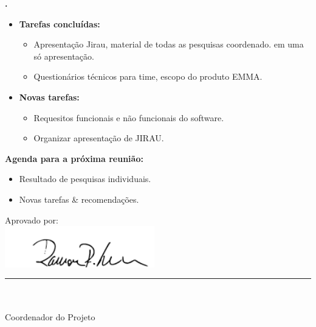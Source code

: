	
   \textbf{\julia.} 
	\begin{itemize}
		\item \textbf{Tarefas concluídas:}
			\begin{itemize}    
				\item Apresentação Jirau, material de todas as pesquisas coordenado.
				em uma só apresentação.
				\item Questionários técnicos para time, escopo do
				produto EMMA.
			\end{itemize}
		
		\item \textbf{Novas tarefas:}
			\begin{itemize} 
			    \item Requesitos funcionais e não funcionais do software.
			    \item Organizar apresentação de JIRAU.
			\end{itemize}
	\end{itemize}		



\textbf{Agenda para a próxima reunião:}
  \begin{itemize}
    \item Resultado de pesquisas individuais.
    \item Novas tarefas \& recomendações.
  \end{itemize}


\vspace{5mm}%
\parbox[t]{70mm}{
  Aprovado por: \\[5mm]
  \centering
  \includegraphics[width=65mm]{figs/logo/assinatura-ramon.png} \\[-4mm]
  \rule[2mm]{70mm}{0.1mm} \\
  \ramon \\[1mm]
  Coordenador do Projeto \\
}

\fim